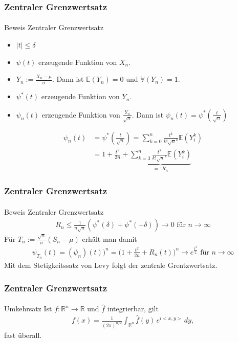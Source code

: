 \documentclass{beamer}
\begin{document}
\begin{frame}
    \frametitle{Zentraler Grenzwertsatz}
\framesubtitle{}

\begin{block}{Beweis Zentraler Grenzwertsatz}
\begin{itemize}
\item $|t| \leq \delta$
\item $\psi(t)$ erzeugende Funktion von $X_n$.
\item $Y_n := \frac{X_n - \mu}{\sigma}$. Dann ist $\mathbb{E}(Y_n) = 0$ und $\mathbb{V}(Y_n) = 1$.
\item $\psi^*(t)$ erzeugende Funktion von $Y_n$.
\item $\psi_n(t)$ erzeugende Funktion von $\frac{Y_n}{\sqrt{n}}$. Dann ist $\psi_n(t) = \psi^*(\frac{t}{\sqrt{n}})$ 
\end{itemize}
\begin{align*}
\psi_n(t) &= \psi^*(\frac{t}{\sqrt{n}}) =  \sum_{k= 0}^n \frac{t^k }{k! \sqrt{n}^k} \mathbb{E}(Y_i^k) \\
& = 1 + \frac{t^2}{2n} +  \underbrace{\sum_{k= 3}^n \frac{t^k }{k! \sqrt{n}^k} \mathbb{E}(Y_i^k)}_{=:R_n} 
\end{align*}
\end{block}

 \end{frame}



\begin{frame}
    \frametitle{Zentraler Grenzwertsatz}
\framesubtitle{}

\begin{block}{Beweis Zentraler Grenzwertsatz}
\begin{align*}
R_n \leq \frac{1}{n \sqrt{n}} (\psi^*(\delta)  + \psi^*(-\delta) ) \rightarrow 0  \text{ für } n \to \infty
\end{align*}
Für $T_n := \frac{\sqrt{n}}{\sigma}(S_n - \mu)$ erhält man damit
\begin{align*}
\psi_{T_n}(t) = (\psi_n)(t))^n = \biggl(  1 + \frac{t^2}{2n} + R_n(t) \biggr)^n \rightarrow e^{\frac{t^2}{2}} \text{ für } n \to \infty
\end{align*}
Mit dem Stetigkeitssatz von Levy folgt der zentrale Grentzwertsatz.
\end{block}

 \end{frame}



\begin{frame}
    \frametitle{Zentraler Grenzwertsatz}
\framesubtitle{}

\begin{block}{Umkehrsatz}
Ist $f: \mathbb{R}^n  \to  \mathbb{R}$ und $\hat{ f}$ integrierbar, gilt
\begin{align*}
f(x) = \frac{1}{\left(2\pi \right)^{n/2}} \int_{\mathbb{R}^n}\hat{ f}(y) \,e^{i  <x, y>} \, d y,
\end{align*}
fast überall.
\end{block}
 \end{frame}
\end{document}
